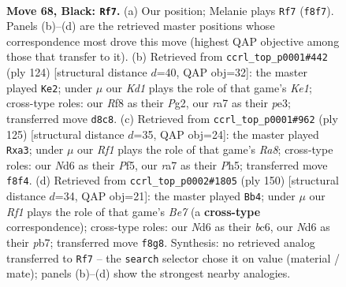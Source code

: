 \documentclass[11pt]{article}
\begin{document}
\clearpage

\begin{figure}[p]\centering
\begin{subfigure}{0.46\textwidth}\centering
\resizebox{\linewidth}{!}{%
\newchessgame
\chessboard[
  setfen={3k1r2/R6p/P2n4/2P5/8/2p4P/2P1K1P1/5B2 b - - 0 68},
  showmover=false,
  pgfstyle=straightmove, color=movearrow, markmove={f8-f7}
]}
\caption{}
\end{subfigure}\hfill
\begin{subfigure}{0.46\textwidth}\centering
\resizebox{\linewidth}{!}{%
\newchessgame
\chessboard[
  setfen={8/2k4p/5Rb1/6R1/p3r3/4p2P/6P1/4K3 w - - 6 63},
  showmover=false,
  pgfstyle=straightmove, color=movearrow, markmove={e1-e2}
]}
\caption{}
\end{subfigure}
\\[4pt]
\begin{subfigure}{0.46\textwidth}\centering
\resizebox{\linewidth}{!}{%
\newchessgame
\chessboard[
  setfen={8/8/2k5/5p1p/4nR1P/P7/6PK/r5B1 b - - 4 63},
  showmover=false,
  pgfstyle=straightmove, color=movearrow, markmove={a1-a3}
]}
\caption{}
\end{subfigure}\hfill
\begin{subfigure}{0.46\textwidth}\centering
\resizebox{\linewidth}{!}{%
\newchessgame
\chessboard[
  setfen={6k1/1pR1B3/p1b5/P4P2/5K2/7P/4p1r1/8 w - - 2 76},
  showmover=false,
  pgfstyle=straightmove, color=movearrow, markmove={e7-b4}
]}
\caption{}
\end{subfigure}
\caption{\textbf{Move 68, Black: \texttt{Rf7}.} (a) Our position; Melanie plays \texttt{Rf7} (\texttt{f8f7}). Panels (b)--(d) are the retrieved master positions whose correspondence most drove this move (highest QAP objective among those that transfer to it). (b) Retrieved from \texttt{ccrl\_top\_p0001\#442} (ply 124) [structural distance $d$=40, QAP obj=32]: the master played \texttt{Ke2}; under $\mu$ our \emph{Kd1} plays the role of that game's \emph{Ke1}; cross-type roles: our \emph{R}f8 as their \emph{P}g2, our \emph{r}a7 as their \emph{p}e3; transferred move \texttt{d8c8}. (c) Retrieved from \texttt{ccrl\_top\_p0001\#962} (ply 125) [structural distance $d$=35, QAP obj=24]: the master played \texttt{Rxa3}; under $\mu$ our \emph{Rf1} plays the role of that game's \emph{Ra8}; cross-type roles: our \emph{N}d6 as their \emph{P}f5, our \emph{r}a7 as their \emph{P}h5; transferred move \texttt{f8f4}. (d) Retrieved from \texttt{ccrl\_top\_p0002\#1805} (ply 150) [structural distance $d$=34, QAP obj=21]: the master played \texttt{Bb4}; under $\mu$ our \emph{Rf1} plays the role of that game's \emph{Be7} (a \textbf{cross-type} correspondence); cross-type roles: our \emph{N}d6 as their \emph{b}c6, our \emph{N}d6 as their \emph{p}b7; transferred move \texttt{f8g8}. Synthesis: no retrieved analog transferred to \texttt{Rf7} -- the \texttt{search} selector chose it on value (material / mate); panels (b)--(d) show the strongest nearby analogies.}
\label{fig:thought-m135}
\end{figure}
\end{document}
